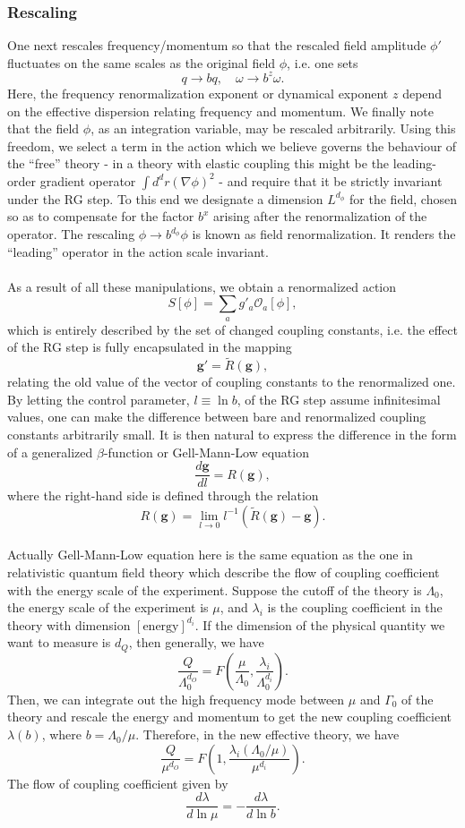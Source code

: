\subsubsection{Rescaling}
One next rescales frequency/momentum so that the rescaled field amplitude $\phi'$ fluctuates on the same scales as the original field $\phi$, i.e. one sets
\[q \to bq , \quad \omega \to b^z \omega.\]
Here, the frequency renormalization exponent or dynamical exponent $z$ depend on the effective dispersion relating
frequency and momentum. 
We finally note that the field $\phi$, as an integration variable, may be rescaled arbitrarily. Using this freedom, we select a term in the action which we believe governs the behaviour of the ``free'' theory - in a theory with elastic coupling this might be the leading-order gradient operator $\int d^d r (\nabla \phi)^2$ - and require that it be strictly invariant under the RG step. 
To this end we designate a dimension $L^{d_{\phi}}$ for the field, chosen so as to compensate for the factor $b^x$ arising after the renormalization of the operator. The rescaling $\phi \to b^{d_{\phi}} \phi$ is known as field renormalization. It renders the ``leading'' operator in the action scale invariant.
\\ \\
As a result of all these manipulations, we obtain a renormalized action
\[S[\phi] = \sum_a g'_a \mathcal{O}_a[\phi],\]
which is entirely described by the set of changed coupling constants, i.e. the effect of the RG step is fully encapsulated in the mapping
\[\bm{g}' = \tilde{R}(\bm{g}),\]
relating the old value of the vector of coupling constants to the renormalized one. 
By letting the control parameter, $l \equiv \ln b$, of the RG step assume infinitesimal values, one can make the difference between bare and renormalized coupling constants
arbitrarily small. 
It is then natural to express the difference in the form of a generalized $\beta$-function or Gell-Mann-Low equation
\[\frac{d\bm{g}}{dl} = R(\bm{g}),\]
where the right-hand side is defined through the relation
\[R(\bm{g}) = \lim_{l \to 0} l^{-1} (\tilde{R}(\bm{g}) - \bm{g}).\]
\\
Actually Gell-Mann-Low equation here is the same equation as the one in relativistic quantum field theory which describe the flow of coupling coefficient with the energy scale of the experiment. Suppose the cutoff of the theory is $\Lambda_0$, the energy scale of the experiment is $\mu$, and $\lambda_i$ is the coupling coefficient in the theory with dimension $[\mbox{energy}] ^{d_{i}}$. If the dimension of the physical quantity we want to measure is $d_Q$, then generally, we have
\[\frac{Q}{\Lambda_0^{d_O}} = F(\frac{\mu}{\Lambda_0},\frac{\lambda_i}{\Lambda_0^{d_i}}).\]
Then, we can integrate out the high frequency mode between $\mu$ and $\Gamma_0$ of the theory and rescale the energy and momentum to get the new coupling coefficient $\lambda(b)$, where $b = \Lambda_0 / \mu$. Therefore, in the new effective theory, we have
\[\frac{Q}{\mu^{d_O}} = F(1,\frac{\lambda_i(\Lambda_0 / \mu)}{\mu^{d_i}}).\]
The flow of coupling coefficient given by
\[\frac{d\lambda}{d\ln \mu} = - \frac{d\lambda}{d\ln b}.\]

